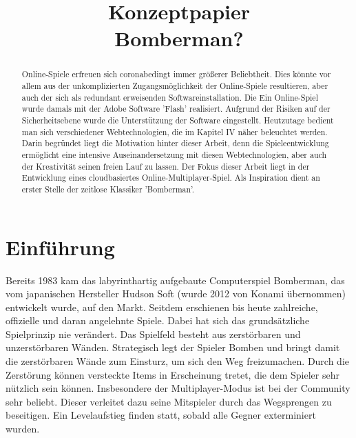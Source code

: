 \documentclass[conference]{IEEEtran}
\begin{document}
\title{Konzeptpapier\\Bomberman?}

\author{
	\and

	\and

	\and

	\and

}

\maketitle

\begin{abstract}
	Online-Spiele erfreuen sich coronabedingt immer größerer Beliebtheit. Dies könnte vor allem aus der unkomplizierten Zugangsmöglichkeit der Online-Spiele resultieren, aber auch der sich als redundant erweisenden Softwareinstallation. Die 
	Ein Online-Spiel wurde damals mit der Adobe Software 'Flash' realisiert. Aufgrund der Risiken auf der Sicherheitsebene wurde die Unterstützung der Software eingestellt. Heutzutage bedient man sich verschiedener Webtechnologien, die im Kapitel IV näher beleuchtet werden.
	Darin begründet liegt die Motivation hinter dieser Arbeit, denn 
	die Spieleentwicklung ermöglicht eine intensive Auseinandersetzung mit diesen Webtechnologien, aber auch der Kreativität seinen freien Lauf zu lassen.
	Der Fokus dieser Arbeit liegt in der Entwicklung eines cloudbasiertes Online-Multiplayer-Spiel. Als Inspiration dient an erster Stelle der zeitlose Klassiker 'Bomberman'.
\end{abstract}

\section{Einführung}
Bereits 1983 kam das labyrinthartig aufgebaute Computerspiel Bomberman, das vom japanischen Hersteller Hudson Soft (wurde 2012 von Konami übernommen) entwickelt wurde, auf den Markt. Seitdem erschienen bis heute zahlreiche, offizielle und daran angelehnte Spiele. Dabei hat sich das grundsätzliche Spielprinzip nie verändert. Das Spielfeld besteht aus zerstörbaren und unzerstörbaren Wänden. Strategisch legt der Spieler Bomben und bringt damit die zerstörbaren Wände zum Einsturz, um sich den Weg freizumachen. Durch die Zerstörung können versteckte Items in Erscheinung tretet, die dem Spieler sehr nützlich sein können. Insbesondere der Multiplayer-Modus ist bei der Community sehr beliebt. Dieser verleitet dazu seine Mitspieler durch das Wegsprengen zu beseitigen. Ein Levelaufstieg finden statt, sobald alle Gegner exterminiert wurden.  
\end{document}
